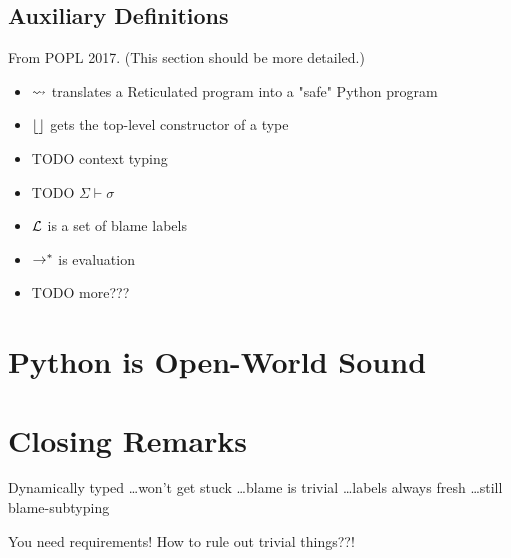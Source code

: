 \documentclass{article}
\begin{document}
\subsection{Auxiliary Definitions}

From POPL 2017.
(This section should be more detailed.)

\begin{itemize}
\item[] $\rightsquigarrow$ translates a Reticulated program into a "safe" Python program
\item[] $\lfloor  \rfloor$ gets the top-level constructor of a type
\item[] TODO context typing
\item[] TODO $\Sigma \vdash \sigma$
\item[] $\mathcal{L}$ is a set of blame labels
\item[] $\rightarrow^*$ is evaluation
\item[] TODO more???
\end{itemize}


\section{Python is Open-World Sound}

\section{Closing Remarks}

Dynamically typed \ldots won't get stuck \ldots blame is trivial \ldots labels always fresh \ldots still blame-subtyping

You need requirements!
How to rule out trivial things??!
\end{document}
